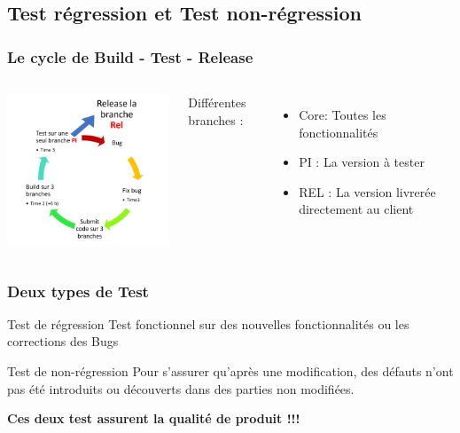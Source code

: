 \documentclass{beamer}
\begin{document}
        \subsection{Test régression et Test non-régression}
        \begin{frame}
            \frametitle{Le cycle de Build - Test - Release}
            \begin{columns}
                \centering
                \includegraphics[width=8cm]{cycle_build_release.png}
                
                Différentes branches : 
                \begin{itemize}
                    \item Core: Toutes les fonctionnalités
                    \item PI : La version à tester
                    \item REL : La version livrerée directement au client
                \end{itemize}
            \end{columns}
        \end{frame}
        
        
        
        \begin{frame}
            \frametitle{Deux types de Test}
            \begin{block}{Test de régression}
                Test fonctionnel sur des nouvelles fonctionnalités ou les corrections des Bugs
            \end{block}
            
            \begin{block}{Test de non-régression}
            Pour s'assurer qu'après une modification, des défauts n'ont pas été introduits ou découverts dans des parties non modifiées.
            \end{block}
            \pause
            
            \centering
            \alert{{\Large{\textbf{Ces deux test assurent la qualité de produit !!!}}}}
        \end{frame}
        
\end{document}
